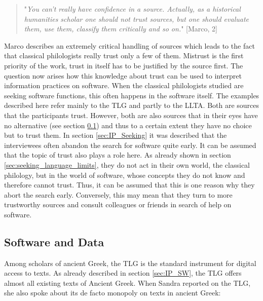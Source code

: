 \documentclass[12pt, a4paper, titlepage, oneside, abstract=true, toc=listof, toc=bibliography, BCOR=1cm]{scrreprt}
\begin{document}
{\begin{quotation}
"\textit{You can't really have confidence in a source. Actually, as a historical humanities scholar one should not trust sources, but one should evaluate them, use them, classify them critically and so on.}" [Marco, 2]
\end{quotation}

Marco describes an extremely critical handling of sources which leads to the fact that classical philologists really trust only a few of them. Mistrust is the first priority of the work, trust in itself has to be justified by the source first. The question now arises how this knowledge about trust can be used to interpret information practices on software. 
When the classical philologists studied are seeking software functions, this often happens in the software itself. The examples described here refer mainly to the TLG and partly to the LLTA. Both are sources that the participants trust. However, both are also sources that in their eyes have no alternative (see section \ref{sec:SW_Data}) and thus to a certain extent they have no choice but to trust them.
In section \ref{sec:IP_Seeking} it was described that the interviewees often abandon the search for software quite early. It can be assumed that the topic of trust also plays a role here. As already shown in section \ref{sec:seeking_language_limits}, they do not act in their own world, the classical philology, but in the world of software, whose concepts they do not know and therefore cannot trust. Thus, it can be assumed that this is one reason why they abort the search early. Conversely, this may mean that they turn to more trustworthy sources and consult colleagues or friends in search of help on software.

\subsection{Software and Data}
\label{sec:SW_Data}
Among scholars of ancient Greek, the TLG is the standard instrument for digital access to texts. As already described in section \ref{sec:IP_SW}, the TLG offers almost all existing texts of Ancient Greek. When Sandra reported on the TLG, she also spoke about its de facto monopoly on texts in ancient Greek: 

}
\end{document}
